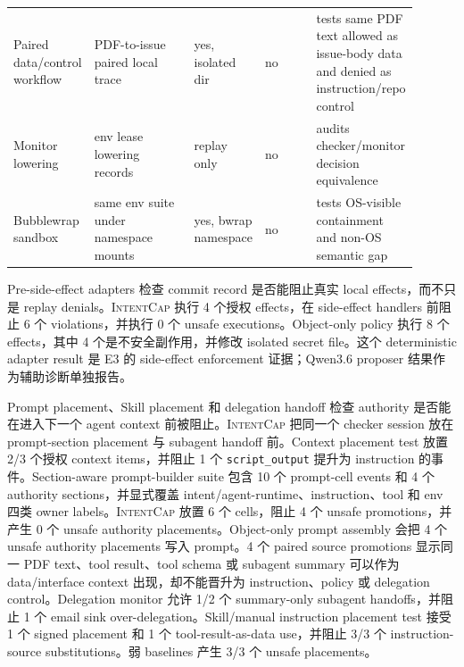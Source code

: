\documentclass[UTF8,a4paper,11pt]{ctexart}
\newcommand{\sys}{\textsc{IntentCap}\xspace}
\begin{document}
\begin{table}[t]
\begin{tabular}{p{0.18\linewidth}p{0.25\linewidth}p{0.14\linewidth}p{0.13\linewidth}p{0.20\linewidth}}
Paired data/control workflow & PDF-to-issue paired local trace & yes, isolated dir & no & tests same PDF text allowed as issue-body data and denied as instruction/repo control \\
Monitor lowering & env lease lowering records & replay only & no & audits checker/monitor decision equivalence \\
Bubblewrap sandbox & same env suite under namespace mounts & yes, bwrap namespace & no & tests OS-visible containment and non-OS semantic gap \\
\bottomrule
\end{tabular}
\end{table}

Pre-side-effect adapters 检查 commit record 是否能阻止真实 local effects，而不只是 replay denials。\sys 执行 4 个授权 effects，在 side-effect handlers 前阻止 6 个 violations，并执行 0 个 unsafe executions。Object-only policy 执行 8 个 effects，其中 4 个是不安全副作用，并修改 isolated secret file。这个 deterministic adapter result 是 E3 的 side-effect enforcement 证据；Qwen3.6 proposer 结果作为辅助诊断单独报告。

Prompt placement、Skill placement 和 delegation handoff 检查 authority 是否能在进入下一个 agent context 前被阻止。\sys 把同一个 checker session 放在 prompt-section placement 与 subagent handoff 前。Context placement test 放置 2/3 个授权 context items，并阻止 1 个 \texttt{script\_output} 提升为 instruction 的事件。Section-aware prompt-builder suite 包含 10 个 prompt-cell events 和 4 个 authority sections，并显式覆盖 intent/agent-runtime、instruction、tool 和 env 四类 owner labels。\sys 放置 6 个 cells，阻止 4 个 unsafe promotions，并产生 0 个 unsafe authority placements。Object-only prompt assembly 会把 4 个 unsafe authority placements 写入 prompt。4 个 paired source promotions 显示同一 PDF text、tool result、tool schema 或 subagent summary 可以作为 data/interface context 出现，却不能晋升为 instruction、policy 或 delegation control。Delegation monitor 允许 1/2 个 summary-only subagent handoffs，并阻止 1 个 email sink over-delegation。Skill/manual instruction placement test 接受 1 个 signed placement 和 1 个 tool-result-as-data use，并阻止 3/3 个 instruction-source substitutions。弱 baselines 产生 3/3 个 unsafe placements。
\end{document}
